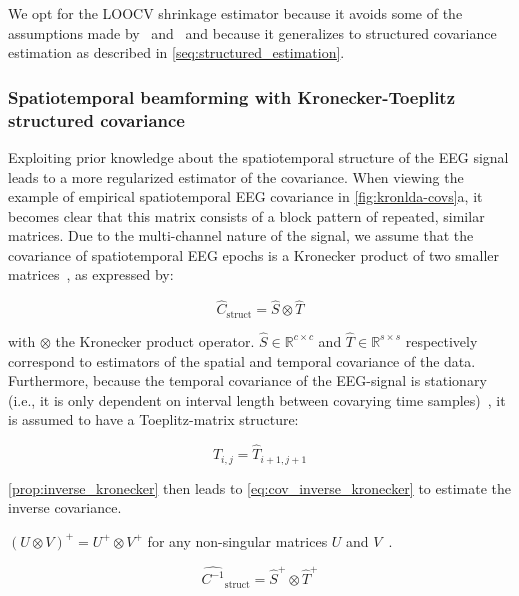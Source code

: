 	We opt for the LOOCV shrinkage estimator because it avoids some of the
	assumptions made by~\cite{Ledoit2004} and~\cite{Chen2010} and
	because it generalizes to structured covariance estimation as described in
	\autoref{seq:structured_estimation}.

	\subsubsection{Spatiotemporal beamforming with Kronecker-Toeplitz structured covariance}
	\label{seq:structured_estimation}
	Exploiting prior knowledge about the spatiotemporal structure of the EEG signal leads to a more regularized estimator of the covariance.
	When viewing the example of empirical spatiotemporal EEG covariance in
	\autoref{fig:kronlda-covs}a, it becomes clear that this matrix consists of a block pattern of repeated, similar matrices.
	Due to the multi-channel nature of the signal, we assume that the covariance of spatiotemporal EEG epochs is a Kronecker
	product of two smaller
	matrices~\cite{Munck1992,DeMunck1999,Huizenga2002}, as expressed
	by:

	\begin{equation}
		\hat{C}_\text{struct} = \hat{S} \otimes \hat{T}
		\label{eq:kronecker}
	\end{equation}

	with $\otimes$ the Kronecker product operator.
	$\hat{S} \in \mathbb{R}^{c\times c}$ and $\hat{T} \in \mathbb{R}^{s\times s}$ respectively correspond to estimators of the spatial and temporal covariance of the data.
	Furthermore, because the temporal covariance of the EEG-signal is
	stationary (i.e., it is only dependent on interval length between covarying
	time samples)~\cite{Bijma2003}, it is assumed to have a Toeplitz-matrix structure:

	\begin{equation}
		\hat{T}_{i,j} = \hat{T}_{i+1,j+1}
		\label{eq:toeplitz}
	\end{equation}

	\autoref{prop:inverse_kronecker} then leads to
	\autoref{eq:cov_inverse_kronecker} to estimate the inverse
	covariance.
	\begin{property}
		$(U \otimes V)^+ = U^+ \otimes V^+$ for any non-singular
		matrices $U$ and $V$~\cite{Langville2004}.
		\label{prop:inverse_kronecker}
	\end{property}

	\begin{equation}
		\widehat{C^{-1}}_\text{struct} = \hat{S}^+ \otimes \hat{T}^+
		\label{eq:cov_inverse_kronecker}
	\end{equation}

